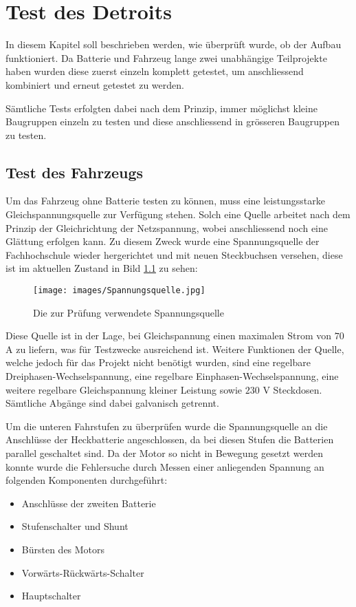\chapter{Test des Detroits}
In diesem Kapitel soll beschrieben werden, wie überprüft wurde, ob der Aufbau funktioniert. Da Batterie und Fahrzeug lange zwei unabhängige Teilprojekte haben wurden diese zuerst einzeln komplett getestet, um anschliessend kombiniert und erneut getestet zu werden.

Sämtliche Tests erfolgten dabei nach dem Prinzip, immer möglichst kleine Baugruppen einzeln zu testen und diese anschliessend in grösseren Baugruppen zu testen.

\section{Test des Fahrzeugs}
Um das Fahrzeug ohne Batterie testen zu können, muss eine leistungsstarke Gleichspannungsquelle zur Verfügung stehen. Solch eine Quelle arbeitet nach dem Prinzip der Gleichrichtung der Netzspannung, wobei anschliessend noch eine Glättung erfolgen kann. Zu diesem Zweck wurde eine Spannungsquelle der Fachhochschule wieder hergerichtet und mit neuen Steckbuchsen versehen, diese ist im aktuellen Zustand in Bild \ref{fig:Spannungsquelle_blau} zu sehen:

\begin{figure}[h]
	\centering
		\texttt{[image: images/Spannungsquelle.jpg]}
	\caption{Die zur Prüfung verwendete Spannungsquelle}
	\label{fig:Spannungsquelle_blau}
\end{figure}

Diese Quelle ist in der Lage, bei Gleichspannung einen maximalen Strom von $70$ A zu liefern, was für Testzwecke ausreichend ist. Weitere Funktionen der Quelle, welche jedoch für das Projekt nicht benötigt wurden, sind eine regelbare Dreiphasen-Wechselspannung, eine regelbare Einphasen-Wechselspannung, eine weitere regelbare Gleichspannung kleiner Leistung sowie $230$ V Steckdosen. Sämtliche Abgänge sind dabei galvanisch getrennt.

Um die unteren Fahrstufen zu überprüfen wurde die Spannungsquelle an die Anschlüsse der Heckbatterie angeschlossen, da bei diesen Stufen die Batterien parallel geschaltet sind. Da der Motor so nicht in Bewegung gesetzt werden konnte wurde die Fehlersuche durch Messen einer anliegenden Spannung an folgenden Komponenten durchgeführt: \begin{itemize}
	\item Anschlüsse der zweiten Batterie
	\item Stufenschalter und Shunt
	\item Bürsten des Motors
	\item Vorwärts-Rückwärts-Schalter
	\item Hauptschalter
\end{itemize}

